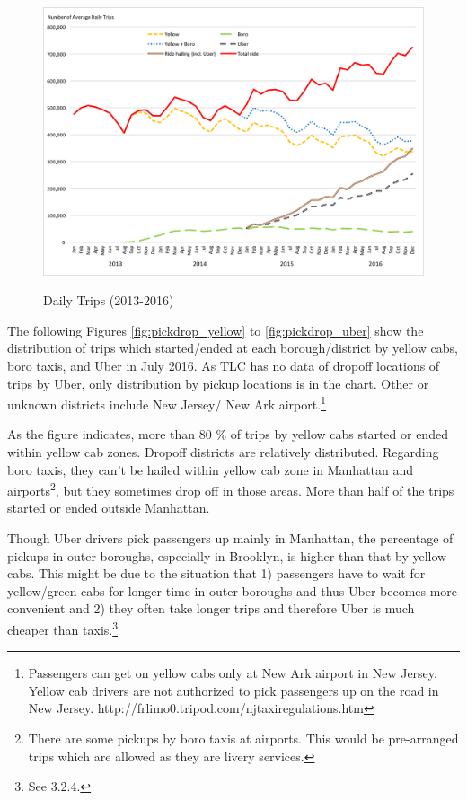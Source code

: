 \begin{figure}[h]
\centering
\caption{Daily Trips (2013-2016)}\label{fig:Daily_trips}\\
\vspace{0.2cm}
\includegraphics[width=12cm]{Figures/Daily_trips.png}
\end{figure}


\indent The following Figures \ref{fig:pickdrop_yellow} to \ref{fig:pickdrop_uber} show the distribution of trips which started/ended at each borough/district by yellow cabs, boro taxis, and Uber in July 2016. As TLC has no data of dropoff locations of trips by Uber, only distribution by pickup locations is in the chart. Other or unknown districts include New Jersey/ New Ark airport.\footnote{Passengers can get on yellow cabs only at New Ark airport in New Jersey. Yellow cab drivers are not authorized to pick passengers up on the road in New Jersey. http://frlimo0.tripod.com/njtaxiregulations.htm} 



As the figure indicates, more than 80 \% of trips by yellow cabs started or ended within yellow cab zones. Dropoff districts are relatively distributed. Regarding boro taxis, they can't be hailed within yellow cab zone in Manhattan and airports\footnote{There are some pickups by boro taxis at airports. This would be pre-arranged trips which are allowed as they are livery services.}, but they sometimes drop off in those areas. More than half of the trips started or ended outside Manhattan.

Though Uber drivers pick passengers up mainly in Manhattan, the percentage of pickups in outer boroughs, especially in Brooklyn, is higher than that by yellow cabs. This might be due to the situation that 1) passengers have to wait for yellow/green cabs for longer time in outer boroughs and thus Uber becomes more convenient and 2) they often take longer trips and therefore Uber is much cheaper than taxis.\footnote{See 3.2.4.}


